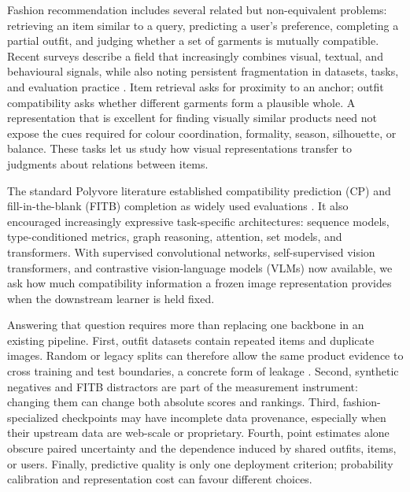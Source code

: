 \documentclass[pdflatex,sn-mathphys-num,iicol]{sn-jnl}
\begin{document}
Fashion recommendation includes several related but non-equivalent problems: retrieving an item similar to a query, predicting a user's preference, completing a partial outfit, and judging whether a set of garments is mutually compatible. Recent surveys describe a field that increasingly combines visual, textual, and behavioural signals, while also noting persistent fragmentation in datasets, tasks, and evaluation practice \cite{ding2024fashion,deldjoo2024review}. Item retrieval asks for proximity to an anchor; outfit compatibility asks whether different garments form a plausible whole. A representation that is excellent for finding visually similar products need not expose the cues required for colour coordination, formality, season, silhouette, or balance. These tasks let us study how visual representations transfer to judgments about relations between items.

The standard Polyvore literature established compatibility prediction (CP) and fill-in-the-blank (FITB) completion as widely used evaluations \cite{han2017bilstm,vasileva2018typeaware,cucurull2019context}. It also encouraged increasingly expressive task-specific architectures: sequence models, type-conditioned metrics, graph reasoning, attention, set models, and transformers. With supervised convolutional networks, self-supervised vision transformers, and contrastive vision-language models (VLMs) now available, we ask how much compatibility information a frozen image representation provides when the downstream learner is held fixed.

Answering that question requires more than replacing one backbone in an existing pipeline. First, outfit datasets contain repeated items and duplicate images. Random or legacy splits can therefore allow the same product evidence to cross training and test boundaries, a concrete form of leakage \cite{kaufman2011leakage,kapoor2023leakage}. Second, synthetic negatives and FITB distractors are part of the measurement instrument: changing them can change both absolute scores and rankings. Third, fashion-specialized checkpoints may have incomplete data provenance, especially when their upstream data are web-scale or proprietary. Fourth, point estimates alone obscure paired uncertainty and the dependence induced by shared outfits, items, or users. Finally, predictive quality is only one deployment criterion; probability calibration and representation cost can favour different choices.
\end{document}
